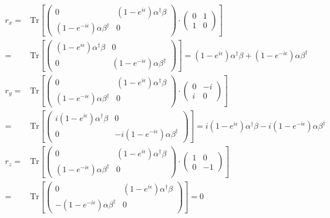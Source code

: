   \begin{equation}
    \begin{split}
      r_{x} = &  \text{Tr} \left[ \begin{pmatrix}
  0 & (1-e^{i\epsilon}) \alpha^{\dag} \beta  \\  
  (1-e^{-i\epsilon}) \alpha \beta^{\dag}& 0
  \end{pmatrix} \cdot \begin{pmatrix}
  0&1\\
  1&0
  \end{pmatrix} \right]  \\
  = & \text{Tr} \left[ \begin{pmatrix}
    (1-e^{i\epsilon}) \alpha^{\dag} \beta  & 0\\
  0 &  (1-e^{-i\epsilon}) \alpha \beta^{\dag}
  \end{pmatrix} \right] = (1-e^{i\epsilon}) \alpha^{\dag} \beta + (1-e^{-i\epsilon}) \alpha \beta^{\dag} \\
  r_{y} = &  \text{Tr} \left[ \begin{pmatrix}
  0 & (1-e^{i\epsilon}) \alpha^{\dag} \beta  \\
  (1-e^{-i\epsilon}) \alpha \beta^{\dag}& 0
  \end{pmatrix} \cdot \begin{pmatrix}
  0&-i\\
  i&0
  \end{pmatrix} \right]  \\
  = & \text{Tr} \left[ \begin{pmatrix}
    i(1-e^{i\epsilon}) \alpha^{\dag} \beta  & 0\\
  0 &  -i(1-e^{-i\epsilon}) \alpha \beta^{\dag}
  \end{pmatrix} \right] = i(1-e^{i\epsilon}) \alpha^{\dag} \beta  - i(1-e^{-i\epsilon}) \alpha \beta^{\dag} \\
  r_{z} = &  \text{Tr} \left[ \begin{pmatrix}
  0 & (1-e^{i\epsilon}) \alpha^{\dag} \beta  \\
  (1-e^{-i\epsilon}) \alpha \beta^{\dag}& 0
  \end{pmatrix} \cdot \begin{pmatrix}
  1&0\\
  0&-1
  \end{pmatrix} \right]  \\
  = & \text{Tr} \left[ \begin{pmatrix}
    0&(1-e^{i\epsilon}) \alpha^{\dag} \beta  \\
    -(1-e^{-i\epsilon}) \alpha \beta^{\dag}& 0
  \end{pmatrix} \right] = 0 \\
    \end{split}
    \end{equation}

